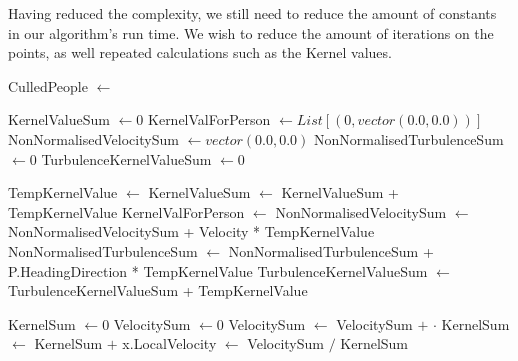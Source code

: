Having reduced the complexity, we still need to reduce the amount of constants in our algorithm's run time. We wish to reduce the amount of iterations on the points, as well repeated calculations such as the Kernel values.


\begin{center}
\label{alg:revised_algorithm}
\begin{algorithmic}[1]

    \State CulledPeople $\gets$  
    \State {}
\EndFor
\EndFunction



\State KernelValueSum $\gets 0$
\State KernelValForPerson $\gets List[(0,vector(0.0,0.0))]$ 
\State NonNormalisedVelocitySum $\gets vector(0.0,0.0)$
\State NonNormalisedTurbulenceSum $\gets 0$
\State TurbulenceKernelValueSum $\gets 0$ 


    \State TempKernelValue $\gets$ 
    \State KernelValueSum $\gets$ KernelValueSum + TempKernelValue
    \State KernelValForPerson $\gets$ 
    \State NonNormalisedVelocitySum $\gets$ NonNormalisedVelocitySum + Velocity * TempKernelValue
        \State NonNormalisedTurbulenceSum $\gets$ NonNormalisedTurbulenceSum + P.HeadingDirection * TempKernelValue
        \State TurbulenceKernelValueSum $\gets$ TurbulenceKernelValueSum + TempKernelValue
    \EndIf
\EndFor


    \State KernelSum $\gets 0$
    \State VelocitySum $\gets 0$
        \State VelocitySum $\gets$ VelocitySum $+$  $\cdot$ 
        \State KernelSum $\gets$ KernelSum $+$ 
    \EndFor
    \State x.LocalVelocity $\gets$ VelocitySum $/$ KernelSum
\EndFor


\end{algorithmic}
\end{center}
